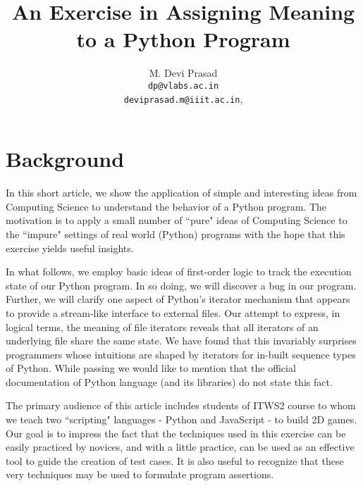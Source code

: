 \documentclass[10pt, a4paper]{article}
\begin{document}
\title{An Exercise in Assigning Meaning to a Python Program}
\author{M. Devi Prasad\vspace*{1.5mm}\\\texttt{dp@vlabs.ac.in}\\\texttt{deviprasad.m@iiit.ac.in},}
\date{}
\maketitle


\section{Background}
In this short article, we show the application of simple and interesting ideas from Computing Science to understand the behavior of a Python program. The motivation is to apply a small number of ``pure" ideas of Computing Science to the ``impure" settings of real world (Python) programs with the hope that this exercise yields useful insights.

In what follows, we employ basic ideas of first-order logic to track the execution state of our Python program. In so doing, we will discover a bug in our program. Further, we will clarify one aspect of Python's iterator mechanism that appears to provide a stream-like interface to external files. Our attempt to express, in logical terms, the meaning of file iterators reveals that all iterators of an underlying file share the same state. We have found that this invariably surprises programmers whose intuitions are shaped by iterators for in-built sequence types of Python. While passing we would like to mention that the official documentation of Python language (and its libraries) do not state this fact.

The primary audience of this article includes students of ITWS2 course to whom we teach two ``scripting" languages - Python and JavaScript - to build 2D games. Our goal is to impress the fact that the techniques used in this exercise can be easily practiced by novices, and with a little practice, can be used as an effective tool to guide the creation of test cases. It is also useful to recognize that these very techniques may be used to formulate program assertions.  
\end{document}
